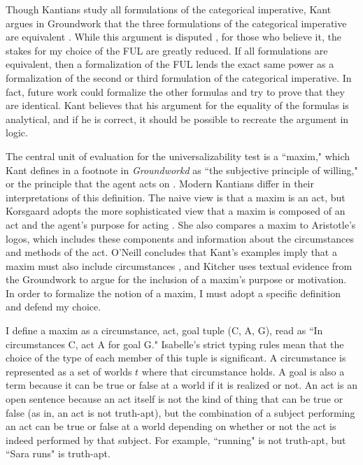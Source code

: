 \begin{isabellebody}
\begin{isamarkuptext}
Though Kantians study all formulations of the categorical imperative, Kant argues in Groundwork 
that the three formulations of the categorical imperative are equivalent \cite{groundwork}. While this 
argument is disputed \cite{sepkant}, for those who believe it, the
stakes for my choice of the FUL are greatly reduced. If all formulations are equivalent, then a formalization of the FUL
lends the exact same power as a formalization of the second or third formulation of the categorical 
imperative. In fact, future work could formalize the other formulas and try to prove that they 
are identical. Kant believes that his argument for the equality of the formulas is analytical, and
if he is correct, it should be possible to recreate the argument in logic.%
\end{isamarkuptext}\isamarkuptrue%
%
\isadelimdocument
%
\endisadelimdocument
%
\isatagdocument
%
\isamarkuptrue%
%
\endisatagdocument
{\isafolddocument}%
%
\isadelimdocument
%
\endisadelimdocument
%
\begin{isamarkuptext}%
The central unit of evaluation for the universalizability test is a ``maxim," which Kant defines 
in a footnote in \emph{Groundworkd} as ``the subjective principle of willing," or the principle that 
the agent acts on \cite[16]{groundwork}. Modern Kantians differ in their interpretations of this definition. The naive view 
is that a maxim is an act, but Korsgaard adopts the more sophisticated view that a maxim is composed
of an act and the agent's purpose for acting \cite{actingforareason}. She also compares a maxim 
to Aristotle's logos, which includes these components and information about the circumstances and methods 
of the act. O'Neill concludes that Kant's examples imply that a maxim must also include circumstances \cite{actingonprinciple}, and 
Kitcher \cite{whatisamaxim} uses textual evidence from the Groundwork to argue for the inclusion of a maxim's purpose 
or motivation. In order to formalize the notion of a maxim, I must adopt a specific definition and 
defend my choice.

I define a maxim as a circumstance, act, goal tuple (C, A, G), read 
as ``In circumstances C, act A for goal G." Isabelle's strict typing rules mean that the choice of the 
type of each member of this tuple is significant. A circumstance is represented as a set of worlds 
$t$ where that circumstance holds. A goal is also a term because it can be true or false at a world if it 
is realized or not. An act is an open sentence because an act itself is not the kind of thing that can 
be true or false (as in, an act is not truth-apt), but the combination of a subject performing an act 
can be true or false at a world depending on whether or not the act is indeed performed by that subject. 
For example, ``running" is not truth-apt, but ``Sara runs" is truth-apt.


\end{isamarkuptext}
\end{isabellebody}

